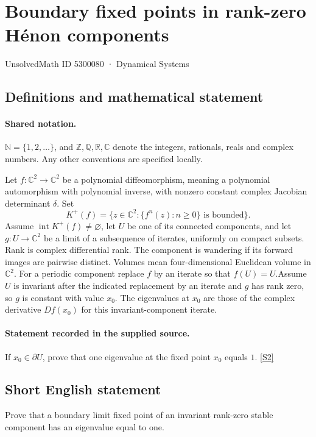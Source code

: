 \documentclass[11pt]{article}
\newcommand{\sref}[2]{\hyperlink{source:#1:#2}{[S#2]}}
\begin{document}
\setcounter{section}{5300079}
\section{Boundary fixed points in rank-zero Hénon components}\label{5300080}
{\small\sffamily UnsolvedMath ID 5300080 · Dynamical Systems}
\subsection{Definitions and mathematical statement}

\paragraph{Shared notation.}$\mathbb N=\{1,2,\ldots\}$, and $\mathbb Z,\mathbb Q,\mathbb R,\mathbb C$ denote the integers, rationals, reals and complex numbers. Any other conventions are specified locally.


Let $f:\mathbb C^2\to\mathbb C^2$ be a polynomial diffeomorphism, meaning a polynomial automorphism with polynomial inverse, with nonzero constant complex Jacobian determinant $\delta$. Set
\[K^+(f)=\{z\in\mathbb C^2:\{f^n(z):n\geq0\}\text{ is bounded}\}.\]
Assume $\operatorname{int}K^+(f)\ne\varnothing$, let $U$ be one of its connected components, and let $g:U\to\mathbb C^2$ be a limit of a subsequence of iterates, uniformly on compact subsets. Rank is complex differential rank. The component is wandering if its forward images are pairwise distinct. Volumes mean four-dimensional Euclidean volume in $\mathbb C^2$. For a periodic component replace $f$ by an iterate so that $f(U)=U$.Assume $U$ is invariant after the indicated replacement by an iterate and $g$ has rank zero, so $g$ is constant with value $x_0$. The eigenvalues at $x_0$ are those of the complex derivative $Df(x_0)$ for this invariant-component iterate.
\paragraph{Statement recorded in the supplied source.}
If $x_0\in\partial U$, prove that one eigenvalue at the fixed point $x_0$ equals $1$. \sref{5300080}{2}
\subsection{Short English statement}
Prove that a boundary limit fixed point of an invariant rank-zero stable component has an eigenvalue equal to one.
\end{document}
